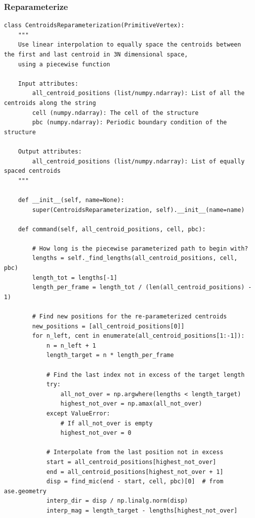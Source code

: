 \documentclass{article}
\begin{document}
\subsubsection{Reparameterize}

\begin{lstlisting}
class CentroidsReparameterization(PrimitiveVertex):
    """
    Use linear interpolation to equally space the centroids between the first and last centroid in 3N dimensional space,
    using a piecewise function

    Input attributes:
        all_centroid_positions (list/numpy.ndarray): List of all the centroids along the string
        cell (numpy.ndarray): The cell of the structure
        pbc (numpy.ndarray): Periodic boundary condition of the structure

    Output attributes:
        all_centroid_positions (list/numpy.ndarray): List of equally spaced centroids
    """

    def __init__(self, name=None):
        super(CentroidsReparameterization, self).__init__(name=name)

    def command(self, all_centroid_positions, cell, pbc):

        # How long is the piecewise parameterized path to begin with?
        lengths = self._find_lengths(all_centroid_positions, cell, pbc)
        length_tot = lengths[-1]
        length_per_frame = length_tot / (len(all_centroid_positions) - 1)

        # Find new positions for the re-parameterized centroids
        new_positions = [all_centroid_positions[0]]
        for n_left, cent in enumerate(all_centroid_positions[1:-1]):
            n = n_left + 1
            length_target = n * length_per_frame

            # Find the last index not in excess of the target length
            try:
                all_not_over = np.argwhere(lengths < length_target)
                highest_not_over = np.amax(all_not_over)
            except ValueError:
                # If all_not_over is empty
                highest_not_over = 0

            # Interpolate from the last position not in excess
            start = all_centroid_positions[highest_not_over]
            end = all_centroid_positions[highest_not_over + 1]
            disp = find_mic(end - start, cell, pbc)[0]  # from ase.geometry
            interp_dir = disp / np.linalg.norm(disp)
            interp_mag = length_target - lengths[highest_not_over]


\end{lstlisting}
\end{document}
